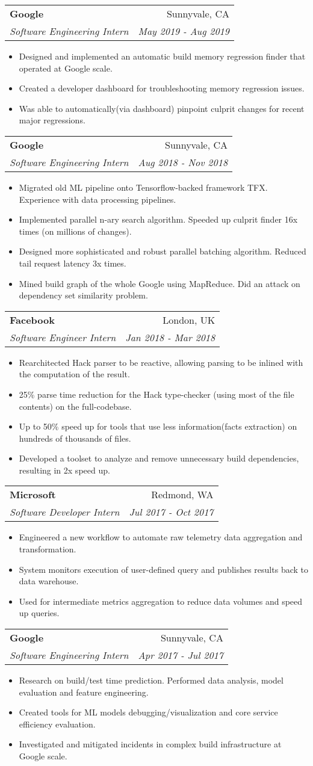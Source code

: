 \documentclass[letterpaper,11pt]{article}
\makeatletter
\newcommand{\resumeItem}[1]{
  \item\small{
    {#1 \vspace{-2pt}}
  }
}
\newcommand{\resumeSubheading}[4]{
  \vspace{-0pt}\item
    \begin{tabular*}{0.97\textwidth}{l@{\extracolsep{\fill}}r}
      \textbf{#1} & #2 \\
      \textit{\small#3} & \textit{\small #4} \\
    \end{tabular*}\vspace{-2pt}
}
\newcommand{\resumeItemListStart}{\begin{itemize}}
\newcommand{\resumeItemListEnd}{\end{itemize}\vspace{-0pt}}
\makeatother
\begin{document}
    \resumeSubheading
      {Google}{Sunnyvale, CA}
      {Software Engineering Intern}{May 2019 - Aug 2019}
      \resumeItemListStart
        \resumeItem{Designed and implemented an automatic build memory regression finder that operated at Google scale.}
        \resumeItem{Created a developer dashboard for troubleshooting memory regression issues.}
        \resumeItem{Was able to automatically(via dashboard) pinpoint culprit changes for recent major regressions.}
      \resumeItemListEnd

    \resumeSubheading
      {Google}{Sunnyvale, CA}
      {Software Engineering Intern}{Aug 2018 - Nov 2018}
      \resumeItemListStart
        \resumeItem{Migrated old ML pipeline onto Tensorflow-backed framework TFX. Experience with data processing pipelines.}
        \resumeItem{Implemented parallel n-ary search algorithm. Speeded up culprit finder 16x times (on millions of changes).}
        \resumeItem{Designed more sophisticated and robust parallel batching algorithm. Reduced tail request latency 3x times.}
        \resumeItem{Mined build graph of the whole Google using MapReduce. Did an attack on dependency set similarity problem.}
      \resumeItemListEnd

    \resumeSubheading
      {Facebook}{London, UK}
      {Software Engineer Intern}{Jan 2018 - Mar 2018}
      \resumeItemListStart
        \resumeItem{Rearchitected Hack parser to be reactive, allowing parsing to be inlined with the computation of the result.}
        \resumeItem{25\% parse time reduction for the Hack type-checker (using most of the file contents) on the full-codebase.}
        \resumeItem{Up to 50\% speed up for tools that use less information(facts extraction) on hundreds of thousands of files.}
        \resumeItem{Developed a toolset to analyze and remove unnecessary build dependencies, resulting in 2x speed up.}
      \resumeItemListEnd

    \resumeSubheading
      {Microsoft}{Redmond, WA}
      {Software Developer Intern}{Jul 2017 - Oct 2017}
      \resumeItemListStart
        \resumeItem{Engineered a new workflow to automate raw telemetry data aggregation and transformation.}
        \resumeItem{System monitors execution of user-defined query and publishes results back to data warehouse.}
        \resumeItem{Used for intermediate metrics aggregation to reduce data volumes and speed up queries.}
      \resumeItemListEnd

    \newpage

    \resumeSubheading
      {Google}{Sunnyvale, CA}
      {Software Engineering Intern}{Apr 2017 - Jul 2017}
      \resumeItemListStart
        \resumeItem{Research on build/test time prediction. Performed data analysis, model evaluation and feature engineering.}
        \resumeItem{Created tools for ML models debugging/visualization and core service efficiency evaluation.}
        \resumeItem{Investigated and mitigated incidents in complex build infrastructure at Google scale.}
      \resumeItemListEnd
\end{document}
